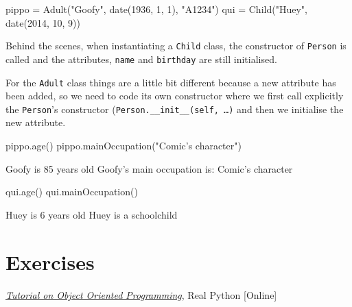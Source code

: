 \begin{ipython}
pippo = Adult("Goofy", date(1936, 1, 1), "A1234")
qui = Child("Huey", date(2014, 10, 9))
\end{ipython}

Behind the scenes, when instantiating a \texttt{Child} class, the constructor of \texttt{Person} is called and the attributes, \texttt{name} and \texttt{birthday} are still initialised.  

For the \texttt{Adult} class things are a little bit different because a new attribute has been added, so we need to code its own constructor where we first call explicitly the \texttt{Person}'s constructor (\texttt{Person.\_\_init\_\_(self, \ldots)} and then we initialise the new attribute.

\begin{ipython}
pippo.age()
pippo.mainOccupation("Comic's character")
\end{ipython}
\begin{ioutput}
Goofy is 85 years old
Goofy's main occupation is: Comic's character
\end{ioutput}

\begin{ipython}
qui.age()
qui.mainOccupation()
\end{ipython}
\begin{ioutput}
Huey is 6 years old
Huey is a schoolchild
\end{ioutput}

\section*{Exercises}


\begin{thebibliography}{9}
 \href{https://realpython.com/python3-object-oriented-programming/}{\emph{Tutorial on Object Oriented Programming}}, Real Python [Online]
\end{thebibliography}
